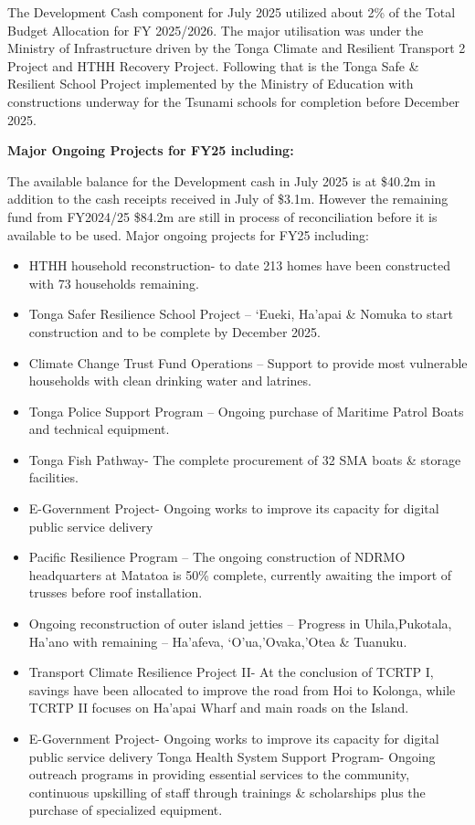 \documentclass[11pt,a4paper]{setup}
\begin{document}
The Development Cash component for July 2025 utilized about 2\% of the Total Budget Allocation for FY 2025/2026. The major utilisation was under the Ministry of Infrastructure driven by the Tonga Climate and Resilient Transport 2 Project and HTHH Recovery Project. Following that is the Tonga Safe \& Resilient School Project implemented by the Ministry of Education  with constructions underway for the Tsunami schools for completion before December 2025. 
\begin{center}
\textbf{Major Ongoing Projects for FY25 including:}
\end{center}
The available balance for the Development cash in July 2025 is at \$40.2m in addition to the cash receipts received in July of \$3.1m. However the remaining fund from FY2024/25 \$84.2m are still in process of reconciliation before it is available to be used. 
Major ongoing projects for FY25 including:
\begin{itemize}

\item HTHH household reconstruction- to date 213 homes have been constructed with 73 households remaining.
\item Tonga Safer Resilience School Project – ‘Eueki, Ha’apai \& Nomuka to start construction and to be complete by December 2025.
\item Climate Change Trust Fund Operations – Support to provide most vulnerable households with clean drinking water and latrines.
\item Tonga Police Support Program – Ongoing purchase of Maritime Patrol Boats and technical equipment.
\item Tonga Fish Pathway- The complete procurement of 32 SMA boats \& storage facilities.
\item E-Government Project- Ongoing works to improve its capacity for digital public service delivery
\item Pacific Resilience Program – The ongoing construction of NDRMO headquarters at Matatoa is 50\% complete, currently awaiting the import of trusses before roof installation.
\item Ongoing reconstruction of outer island jetties – Progress in Uhila,Pukotala, Ha’ano with remaining – Ha’afeva, ‘O’ua,’Ovaka,’Otea \& Tuanuku.
\item Transport Climate Resilience Project II- At the conclusion of TCRTP I, savings have been allocated to improve the road from Hoi to Kolonga, while TCRTP II focuses on Ha’apai Wharf and main roads on the Island.
\item E-Government Project- Ongoing works to improve its capacity for digital public service delivery
Tonga Health System Support Program- Ongoing outreach programs in providing essential services to the community, continuous upskilling of staff through trainings \& scholarships plus the purchase of specialized equipment. 

\end{itemize}
\end{document}
